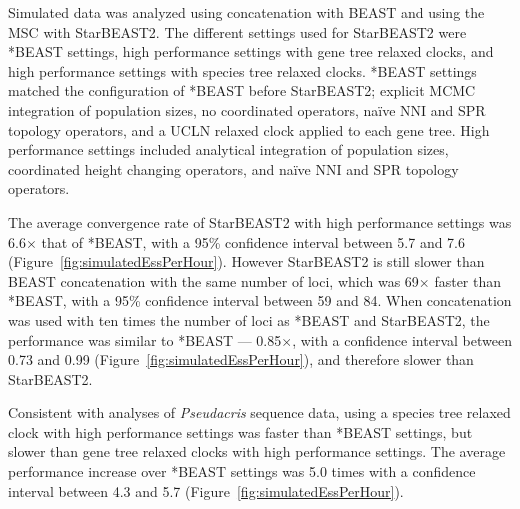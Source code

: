 \documentclass[12pt]{article}
\begin{document}
Simulated data was analyzed using concatenation with BEAST and using the MSC with
StarBEAST2. The different settings used for StarBEAST2 were *BEAST settings,
high performance settings with gene tree relaxed clocks, and high performance settings with
species tree relaxed clocks. *BEAST settings matched the configuration of *BEAST
before StarBEAST2; explicit MCMC integration of population sizes, no
coordinated operators, na\"ive NNI and SPR topology operators, and a UCLN
relaxed clock applied to each gene tree. High performance settings included analytical
integration of population sizes, coordinated height changing operators, and
na\"ive NNI and SPR topology operators.

The average convergence rate of StarBEAST2 with high performance settings
was 6.6$\times$ that of *BEAST, with a 95\% confidence interval between
5.7 and 7.6 (Figure~\ref{fig:simulatedEssPerHour}). However StarBEAST2 is still
slower than BEAST concatenation with the same number of loci, which was 69$\times$
faster than *BEAST, with a 95\% confidence interval between 59 and 84. When
concatenation was used with ten times the number of loci as *BEAST and StarBEAST2, the
performance was similar to *BEAST --- 0.85$\times$, with a confidence interval
between 0.73 and 0.99 (Figure~\ref{fig:simulatedEssPerHour}), and therefore
slower than StarBEAST2.

Consistent with analyses of \textit{Pseudacris} sequence data, using a species
tree relaxed clock with high performance settings was faster than *BEAST settings, but slower than
gene tree relaxed clocks with high performance settings. The average performance
increase over *BEAST settings was 5.0 times with a confidence interval
between 4.3 and 5.7 (Figure~\ref{fig:simulatedEssPerHour}).
\end{document}

